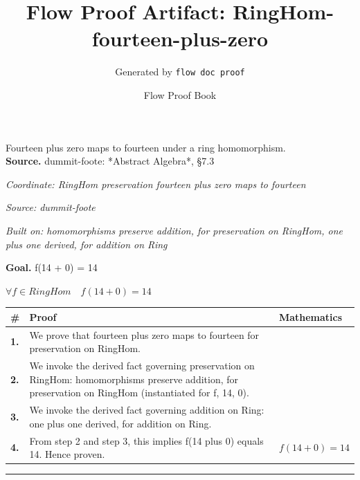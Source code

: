 \documentclass[11pt]{article}
\title{Flow Proof Artifact: RingHom-fourteen-plus-zero}
\author{Generated by \texttt{flow doc proof}}
\date{Flow Proof Book}
\theoremstyle{definition}
\begin{document}
\maketitle
Fourteen plus zero maps to fourteen under a ring homomorphism.\\[0.5em]
\textbf{Source.} dummit-foote: *Abstract Algebra*, §7.3\\[0.5em]
\bigskip
{}\par
\smallskip\noindent\textit{Coordinate: RingHom \cdot preservation \cdot fourteen plus zero maps to fourteen}\par
\smallskip\noindent\textit{Source: dummit-foote}\par
\smallskip\noindent\textit{Built on: homomorphisms preserve addition, for preservation on RingHom, one plus one derived, for addition on Ring}\par
\medskip
\noindent\textbf{Goal.} f(14 + 0) = 14\par
\noindent$\displaystyle \forall f \in RingHom\quad f(14 + 0) = 14$\par
\medskip
\noindent
\begin{tabular}{@{} >{\raggedright\arraybackslash}p{} >{\raggedright\arraybackslash}p{} >{\raggedleft\arraybackslash}p{} @{}}
\textbf{\#} & \textbf{Proof} & \textbf{Mathematics} \\
\midrule
\textbf{1.} & We prove that fourteen plus zero maps to fourteen for preservation on RingHom. & \\[0.45em]
\textbf{2.} & We invoke the derived fact governing preservation on RingHom: homomorphisms preserve addition, for preservation on RingHom (instantiated for f, 14, 0). & \\[0.45em]
\textbf{3.} & We invoke the derived fact governing addition on Ring: one plus one derived, for addition on Ring. & \\[0.45em]
\textbf{4.} & From step 2 and step 3, this implies f(14 plus 0) equals 14. Hence proven. & $\displaystyle f(14 + 0) = 14$ \\[0.45em]
\bottomrule
\end{tabular}
\label{thm:RingHom-preservation-fourteen_plus_zero_maps_to_fourteen}
\par\medskip\hrule
\end{document}
